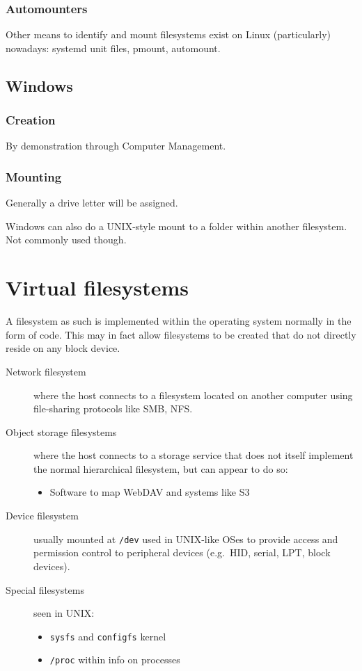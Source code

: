 \subsubsection{Automounters}\label{automounters}

Other means to identify and mount filesystems exist on Linux
(particularly) nowadays: systemd unit files, pmount, automount.

\subsection{Windows}\label{windows}

\subsubsection{Creation}\label{creation-1}

By demonstration through Computer Management.

\subsubsection{Mounting}\label{mounting-1}

Generally a drive letter will be assigned.

Windows can also do a UNIX-style mount to a folder within another
filesystem. Not commonly used though.

\section{Virtual filesystems}
\label{sec:virtual-filesystems}

A filesystem as such is implemented within the operating system normally
in the form of code. This may in fact allow filesystems to be created
that do not directly reside on any block device.

\begin{description}
\item[Network filesystem]
where the host connects to a filesystem located on another computer
using file-sharing protocols like SMB, NFS.
\item[Object storage filesystems]
where the host connects to a storage service that does not itself
implement the normal hierarchical filesystem, but can appear to do so:

\begin{itemize}

\item
  Software to map WebDAV and systems like S3
\end{itemize}
\item[Device filesystem]
usually mounted at \texttt{/dev} used in UNIX-like OSes to provide
access and permission control to peripheral devices (e.g.~HID, serial,
LPT, block devices).
\item[Special filesystems]
seen in UNIX:

\begin{itemize}
\item
  \texttt{sysfs} and \texttt{configfs} kernel
\item
  \texttt{/proc} within info on processes
\end{itemize}
\end{description}
